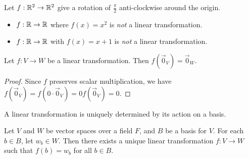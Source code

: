 \begin{exmp}
    Let $f: \mathbb{R}^2 \to \mathbb{R}^2$ give a rotation of $\frac{\pi}{2}$ anti-clockwise around the origin.
\end{exmp}

\begin{exmp}\proofbreak
    \begin{itemize}
        \item $f: \mathbb{R} \to \mathbb{R}$ where $f(x) = x^2$ is \emph{not} a linear transformation.
        \item $f: \mathbb{R} \to \mathbb{R}$ with $f(x) = x + 1$ is \emph{not} a linear transformation.
    \end{itemize}
\end{exmp}

\begin{prop}\label{zero-maps-to-zero}
    Let $f: V \to W$ be a linear transformation. Then $f(\vec{0}_V) = \vec{0}_W$.
\end{prop}

\begin{proof}
    Since $f$ preserves scalar multiplication, we have $f(\vec{0}_V) = f(0 \cdot \vec{0}_V) = 0f(\vec{0}_V) = 0$.
\end{proof}

\begin{prop}\label{action-on-basis}
    A linear transformation is uniquely determined by its action on a basis.

    Let $V$ and $W$ be vector spaces over a field $F$, and $B$ be a basis for $V$. For each $b \in B$, let $w_b \in W$. Then there exists a unique linear transformation $f: V \to W$ such that $f(b) = w_b$ for all $b \in B$.
\end{prop}

